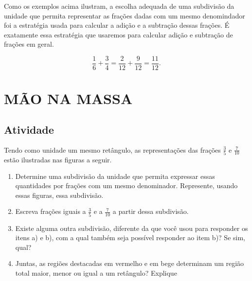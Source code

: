 Como os exemplos acima ilustram, a escolha adequada de uma subdivisão da unidade que permita representar as frações dadas com um mesmo denomindador foi a estratégia usada para calcular a adição e a subtração dessas frações. É exatamente essa estratégia que usaremos para calcular adição e subtração de frações em geral. 

$$\dfrac{1}{6} + \dfrac{3}{4} = \dfrac{2}{12} + \dfrac{9}{12} = \dfrac{11}{12}.$$


\section{MÃO NA MASSA }

\subsection{Atividade}

Tendo como unidade um mesmo retângulo, as representações das frações $\frac{3}{5}$ e $\frac{7}{10}$ estão ilustradas nas figuras a seguir. 

\begin{center}
\end{center}

\begin{enumerate} [\quad a)] %
  \item     Determine uma subdivisão da unidade que permita expressar essas quantidades por frações com um mesmo denominador. Represente, usando essas figuras, essa subdivisão.
  \item     Escreva frações iguais a     $\frac{3}{5}$     e a     $\frac{7}{10}$     a partir dessa subdivisão.
  \item     Existe alguma outra subdivisão, diferente da que você usou para responder os itens a) e b), com a qual também seja possível responder ao item b)? Se sim, qual? 
  \item     Juntas, as regiões destacadas em vermelho e em bege determinam um região total maior, menor ou igual a um retângulo? Explique
\end{enumerate} %

